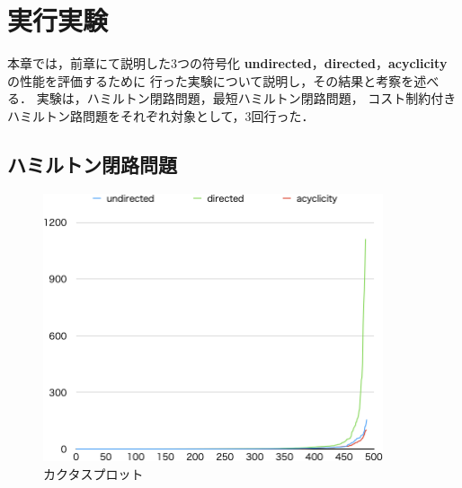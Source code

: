 \chapter{実行実験}\label{chap:experiment}
本章では，前章にて説明した3つの符号化
\textbf{undirected}，\textbf{directed}，\textbf{acyclicity}
の性能を評価するために
行った実験について説明し，その結果と考察を述べる．
実験は，ハミルトン閉路問題，最短ハミルトン閉路問題，
コスト制約付きハミルトン路問題をそれぞれ対象として，3回行った．

\section{ハミルトン閉路問題}

\begin{figure}[tb]
\begin{center}
  \includegraphics[width=10cm]{fig/cactus.png}
\caption{カクタスプロット}
\label{cactus}
\end{center}
\end{figure}


